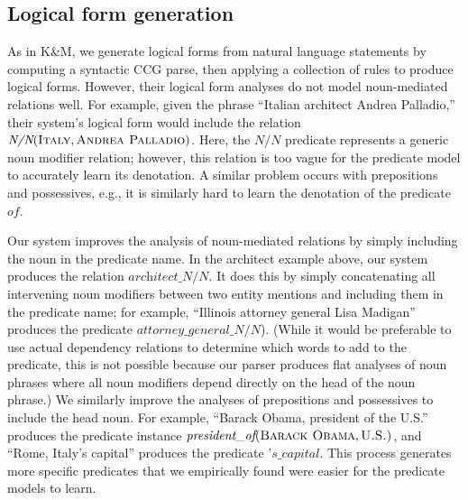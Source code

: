\documentclass[11pt]{article}
\newcommand{\secref}[1]{Section~\ref{sec:#1}}
\newcommand{\lexicalpredicate}[1]{\ensuremath{\textit{#1}}}
\newcommand{\entity}[1]{\ensuremath{\textsc{#1}}}
\begin{document}

\subsection{Logical form generation}
\label{sec:better-lfs}

As in K\&M, we generate logical forms from natural language statements
by computing a syntactic CCG parse, then applying a collection of
rules to produce logical forms. However, their logical form analyses
do not model noun-mediated relations well. For example, given the
phrase ``Italian architect Andrea Palladio,'' their system's logical
form would include the relation
$\lexicalpredicate{N/N}(\entity{Italy}, \entity{Andrea
  Palladio})$. Here, the \lexicalpredicate{N/N} predicate represents a
generic noun modifier relation; however, this relation is too vague
for the predicate model to accurately learn its denotation. A similar
problem occurs with prepositions and possessives, e.g., it is
similarly hard to learn the denotation of the predicate
\lexicalpredicate{of}.

Our system improves the analysis of noun-mediated relations by simply
including the noun in the predicate name. In the architect example
above, our system produces the relation
\lexicalpredicate{architect\_N/N}. It does this by simply
concatenating all intervening noun modifiers between two entity
mentions and including them in the predicate name; for example,
``Illinois attorney general Lisa Madigan'' produces the predicate
\lexicalpredicate{attorney\_general\_N/N}). (While it would be
preferable to use actual dependency relations to determine which words
to add to the predicate, this is not possible because our parser
produces flat analyses of noun phrases where all noun modifiers depend
directly on the head of the noun phrase.) We similarly improve the
analyses of prepositions and possessives to include the head noun. For
example, ``Barack Obama, president of the U.S.'' produces the
predicate instance $\lexicalpredicate{president\_of}(\entity{Barack
  Obama}, \entity{U.S.})$, and ``Rome, Italy's capital'' produces the
predicate \lexicalpredicate{'s\_capital}. This process generates more
specific predicates that we empirically found were easier for the
predicate models to learn.
\end{document}
